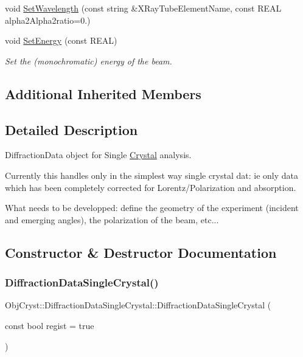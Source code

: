 \begin{DoxyCompactItemize}
void \mbox{\hyperlink{class_obj_cryst_1_1_diffraction_data_single_crystal_a231437207dca7389aa593b1fd4fd9f1b}{Set\+Wavelength}} (const string \&X\+Ray\+Tube\+Element\+Name, const R\+E\+AL alpha2\+Alpha2ratio=0.)
\item 
\mbox{\label{class_obj_cryst_1_1_diffraction_data_single_crystal_a4fa3e393b4b643bd02d184c043954def}} 
void \mbox{\hyperlink{class_obj_cryst_1_1_diffraction_data_single_crystal_a4fa3e393b4b643bd02d184c043954def}{Set\+Energy}} (const R\+E\+AL)
\begin{DoxyCompactList}\small\item\em Set the (monochromatic) energy of the beam. \end{DoxyCompactList}\end{DoxyCompactItemize}
\subsection*{Additional Inherited Members}


\subsection{Detailed Description}
Diffraction\+Data object for Single \mbox{\hyperlink{class_obj_cryst_1_1_crystal}{Crystal}} analysis. 

Currently this handles only in the simplest way single crystal dat\+: ie only data which has been completely corrected for Lorentz/\+Polarization and absorption.

What needs to be developped\+: define the geometry of the experiment (incident and emerging angles), the polarization of the beam, etc... 

\subsection{Constructor \& Destructor Documentation}
\mbox{\label{class_obj_cryst_1_1_diffraction_data_single_crystal_ab182bcffdd5cded6e7bd536bc71a3241}} 
\subsubsection{\texorpdfstring{DiffractionDataSingleCrystal()}{DiffractionDataSingleCrystal()}\hspace{0.1cm}{\footnotesize\ttfamily [1/2]}}
{\footnotesize\ttfamily Obj\+Cryst\+::\+Diffraction\+Data\+Single\+Crystal\+::\+Diffraction\+Data\+Single\+Crystal (\begin{DoxyParamCaption}\item[{const bool}]{regist = {\ttfamily true} }\end{DoxyParamCaption})}

